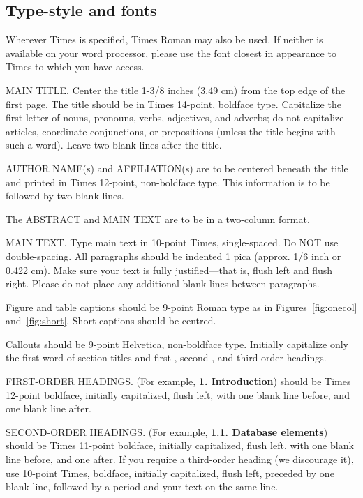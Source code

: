 \documentclass[10pt,twocolumn,letterpaper]{article}
\begin{document}
\begin{CJK}{UTF8}{bkai}
   \subsection{Type-style and fonts}

   Wherever Times is specified, Times Roman may also be used. If neither is
   available on your word processor, please use the font closest in
   appearance to Times to which you have access.

   MAIN TITLE. Center the title 1-3/8 inches (3.49 cm) from the top edge of
   the first page. The title should be in Times 14-point, boldface type.
   Capitalize the first letter of nouns, pronouns, verbs, adjectives, and
   adverbs; do not capitalize articles, coordinate conjunctions, or
   prepositions (unless the title begins with such a word). Leave two blank
   lines after the title.

   AUTHOR NAME(s) and AFFILIATION(s) are to be centered beneath the title
   and printed in Times 12-point, non-boldface type. This information is to
   be followed by two blank lines.

   The ABSTRACT and MAIN TEXT are to be in a two-column format.

   MAIN TEXT. Type main text in 10-point Times, single-spaced. Do NOT use
   double-spacing. All paragraphs should be indented 1 pica (approx. 1/6
   inch or 0.422 cm). Make sure your text is fully justified---that is,
   flush left and flush right. Please do not place any additional blank
   lines between paragraphs.

   Figure and table captions should be 9-point Roman type as in
   Figures~\ref{fig:onecol} and~\ref{fig:short}.  Short captions should be centred.

   \noindent Callouts should be 9-point Helvetica, non-boldface type.
   Initially capitalize only the first word of section titles and first-,
   second-, and third-order headings.

   FIRST-ORDER HEADINGS. (For example, {\large \bf 1. Introduction})
   should be Times 12-point boldface, initially capitalized, flush left,
   with one blank line before, and one blank line after.

   SECOND-ORDER HEADINGS. (For example, { \bf 1.1. Database elements})
   should be Times 11-point boldface, initially capitalized, flush left,
   with one blank line before, and one after. If you require a third-order
   heading (we discourage it), use 10-point Times, boldface, initially
   capitalized, flush left, preceded by one blank line, followed by a period
   and your text on the same line.


\end{CJK}
\end{document}
